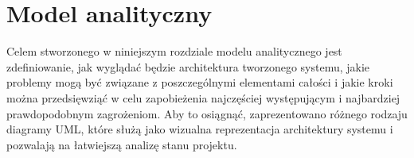\newpage
\section{Model analityczny}

Celem stworzonego w niniejszym rozdziale modelu analitycznego jest
zdefiniowanie, jak wyglądać będzie architektura tworzonego systemu, jakie
problemy mogą być związane z poszczególnymi elementami całości i jakie kroki
można przedsięwziąć w celu zapobieżenia najczęściej występującym i najbardziej
prawdopodobnym zagrożeniom. Aby to osiągnąć, zaprezentowano różnego rodzaju
diagramy UML, które służą jako wizualna reprezentacja architektury systemu i
pozwalają na łatwiejszą analizę stanu projektu.



